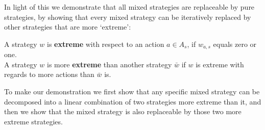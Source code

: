 In light of this we demonstrate that all mixed strategies are replaceable by pure strategies, by showing that every mixed strategy can be iteratively replaced by other strategies that are more `extreme':

\begin{definition}\label{def2}
A strategy $w$ is \textbf{extreme} with respect to an action $a\in A_{s}$, if $w_{a,s}$ equals zero or one.\\A strategy $w$ is more \textbf{extreme} than another strategy $\bar{w}$ if $w$ is extreme with regards to more actions than $\bar{w}$ is.
\end{definition}

To make our demonstration we first show that any specific mixed strategy can be decomposed into a linear combination of two strategies more extreme than it, and then we show that the mixed strategy is also replaceable by those two more extreme strategies.

